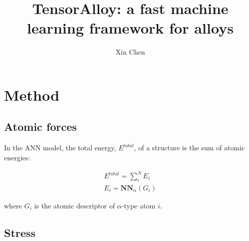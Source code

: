 \documentclass[a4paper]{article}
\title{TensorAlloy: a fast machine learning framework for alloys}
\author{Xin Chen}
\begin{document}
\maketitle


\section{Method}


\subsection{Atomic forces}

In the ANN model, the total energy, $E^{total}$, of a structure is the sum of 
atomic energies:

\begin{gather}
E^{total} = \sum_{i}^{N}{E_i} \\
E_i = \mathbf{NN}_\alpha (G_i)
\end{gather}

\noindent where $G_i$ is the atomic descriptor of $\alpha$-type atom $i$. 

\subsection{Stress}
\end{document}
